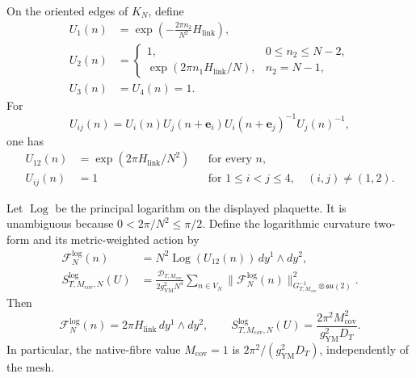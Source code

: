 \begin{theorem}
\label{cusp-link-flux-theorem}
On the oriented edges of \(K_N\), define
\begin{align}
 U_1(n)&=\exp\left(-\frac{2\pi n_2}{N^2}H_{\mathrm{link}}\right),
 \label{cusp-link-flux-u1}\\
 U_2(n)&=
 \begin{cases}
  1,&0\leq n_2\leq N-2,\\[1mm]
  \exp(2\pi n_1H_{\mathrm{link}}/N),&n_2=N-1,
 \end{cases}
 \label{cusp-link-flux-u2}\\
 U_3(n)&=U_4(n)=1.
 \label{cusp-link-flux-u34}
\end{align}
For
\begin{equation}
 U_{ij}(n)=U_i(n)U_j(n+\mathbf e_i)
            U_i(n+\mathbf e_j)^{-1}U_j(n)^{-1},
 \label{cusp-link-plaquette-convention}
\end{equation}
one has
\begin{equation}
 \begin{aligned}
 U_{12}(n)&=\exp(2\pi H_{\mathrm{link}}/N^2)
 &&\text{for every }n,\\
 U_{ij}(n)&=1
 &&\text{for }1\leq i<j\leq4,\quad(i,j)\neq(1,2).
 \end{aligned}
 \label{cusp-link-plaquette-values}
\end{equation}

Let \(\operatorname{Log}\) be the principal logarithm on the displayed
plaquette.  It is unambiguous because \(0<2\pi/N^2\leq\pi/2\).  Define
the logarithmic curvature two-form and its metric-weighted action by
\begin{align}
 \mathcal F_N^{\log}(n)
 &=N^2\operatorname{Log}(U_{12}(n))\,dy^1\wedge dy^2,
 \label{cusp-link-log-curvature}\\
 S^{\log}_{T,M_{\mathrm{cov}},N}(U)
 &=\frac{\mathcal D_{T,M_{\mathrm{cov}}}}{2g_{\mathrm{YM}}^2N^4}
   \sum_{n\in V_N}
   \lVert\mathcal F_N^{\log}(n)\rVert^2_{
       G_{T,M_{\mathrm{cov}}}^{-1}\otimes\mathfrak{su}(2)}.
 \label{cusp-link-log-action}
\end{align}
Then
\begin{equation}
 \mathcal F_N^{\log}(n)=2\pi H_{\mathrm{link}}\,dy^1\wedge dy^2,
 \qquad
 S^{\log}_{T,M_{\mathrm{cov}},N}(U)
 =\frac{2\pi^2M_{\mathrm{cov}}^2}{g_{\mathrm{YM}}^2D_T}.
 \label{cusp-link-log-action-value}
\end{equation}
In particular, the native-fibre value \(M_{\mathrm{cov}}=1\) is
\(2\pi^2/(g_{\mathrm{YM}}^2D_T)\), independently of the mesh.


\end{theorem}
